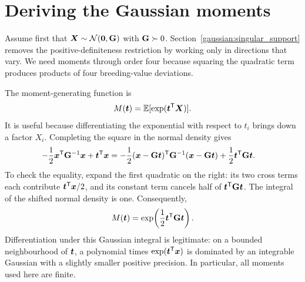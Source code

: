 \section{Deriving the Gaussian moments}
\label{gaussian:moments}

Assume first that $\boldsymbol{X}\sim\mathcal N(\boldsymbol{0},\mathbf{G})$ with
$\mathbf{G}\succ0$. Section~\ref{gaussian:singular_support} removes the
positive-definiteness restriction by working only in directions that vary.
We need moments through order four because squaring the quadratic term
produces products of four breeding-value deviations.

The moment-generating function is
\[
M(\boldsymbol{t})=\mathbb E[\exp(\boldsymbol{t}^{\mathsf T}\boldsymbol{X})].
\]
It is useful because differentiating the exponential with respect to $t_i$
brings down a factor $X_i$. Completing the square in the normal density gives
\begin{align}
-\frac12\boldsymbol{x}^{\mathsf T}\mathbf{G}^{-1}\boldsymbol{x}
 +\boldsymbol{t}^{\mathsf T}\boldsymbol{x}
 &=-\frac12(\boldsymbol{x}-\mathbf{G}\boldsymbol{t})^{\mathsf T}
          \mathbf{G}^{-1}(\boldsymbol{x}-\mathbf{G}\boldsymbol{t})
   +\frac12\boldsymbol{t}^{\mathsf T}\mathbf{G}\boldsymbol{t}.
\end{align}
To check the equality, expand the first quadratic on the right: its two
cross terms each contribute $\boldsymbol{t}^{\mathsf T}\boldsymbol{x}/2$, and its
constant term cancels half of $\boldsymbol{t}^{\mathsf T}\mathbf{G}\boldsymbol{t}$.
The integral of the shifted normal density is one. Consequently,
\begin{equation}
M(\boldsymbol{t})=\exp\!\left(\frac12\boldsymbol{t}^{\mathsf T}\mathbf{G}\boldsymbol{t}\right).
\label{gaussian:mgf}
\end{equation}
Differentiation under this Gaussian integral is legitimate: on a bounded
neighbourhood of $\boldsymbol{t}$, a polynomial times
$\exp(\boldsymbol{t}^{\mathsf T}\boldsymbol{x})$ is dominated by an integrable Gaussian
with a slightly smaller positive precision. In particular, all moments
used here are finite.

